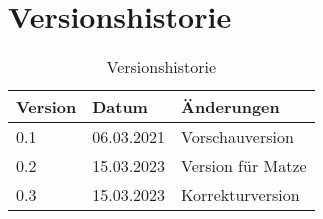 \section*{Versionshistorie}

\begin{table}[ht]
  \centering
  \begin{tabular}{|l|l|l|}
    \hline
    \textbf{Version} & \textbf{Datum} & \textbf{Änderungen} \\ \hline
    0.1              & 06.03.2021     & Vorschauversion     \\ \hline
    0.2              & 15.03.2023     & Version für Matze   \\ \hline
    0.3              & 15.03.2023     & Korrekturversion    \\ \hline
  \end{tabular}
  \caption{Versionshistorie}
  \label{tab:versionshistorie}
\end{table}